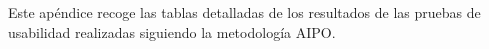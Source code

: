 
Este apéndice recoge las tablas detalladas de los resultados de las pruebas de usabilidad realizadas siguiendo la metodología AIPO.
